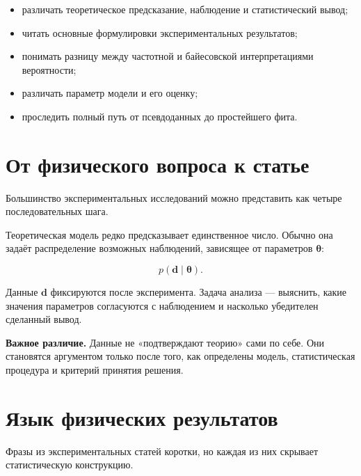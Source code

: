 \documentclass[
  russian,
  12pt,
  a4paper,
  a4paper,
  openany]{scrbook}
\providecommand{\tightlist}{%
  \setlength{\itemsep}{0pt}\setlength{\parskip}{0pt}}
\begin{document}
\begin{itemize}
\tightlist
\item
  различать теоретическое предсказание, наблюдение и статистический
  вывод;
\item
  читать основные формулировки экспериментальных результатов;
\item
  понимать разницу между частотной и байесовской интерпретациями
  вероятности;
\item
  различать параметр модели и его оценку;
\item
  проследить полный путь от псевдоданных до простейшего фита.
\end{itemize}

\section{От физического вопроса к
статье}\label{ux43eux442-ux444ux438ux437ux438ux447ux435ux441ux43aux43eux433ux43e-ux432ux43eux43fux440ux43eux441ux430-ux43a-ux441ux442ux430ux442ux44cux435}

Большинство экспериментальных исследований можно представить как четыре
последовательных шага.

Теоретическая модель редко предсказывает единственное число. Обычно она
задаёт распределение возможных наблюдений, зависящее от параметров
\(\boldsymbol{\theta}\):

\[p(\mathbf d\mid \boldsymbol{\theta}).\]

Данные \(\mathbf d\) фиксируются после эксперимента. Задача анализа ---
выяснить, какие значения параметров согласуются с наблюдением и
насколько убедителен сделанный вывод.

\begin{booknote}

\textbf{Важное различие.} Данные не «подтверждают теорию» сами по себе.
Они становятся аргументом только после того, как определены модель,
статистическая процедура и критерий принятия решения.

\end{booknote}

\section{Язык физических
результатов}\label{ux44fux437ux44bux43a-ux444ux438ux437ux438ux447ux435ux441ux43aux438ux445-ux440ux435ux437ux443ux43bux44cux442ux430ux442ux43eux432}

Фразы из экспериментальных статей коротки, но каждая из них скрывает
статистическую конструкцию.
\end{document}
